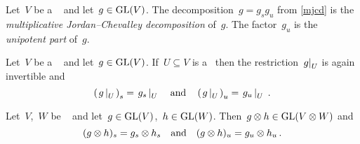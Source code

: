 \begin{definition}
  Let~$V$ be a ~ and let~$g \in \operatorname{GL}(V)$.
  The decomposition~$g = g_s g_u$ from \cref{mjcd} is the \emph{multiplicative Jordan\nobreakdash--Chevalley decomposition} of~$g$.
  The factor~$g_u$ is the \emph{unipotent part} of~$g$.
\end{definition}


\begin{lemma}
  Let~$V$ be a ~ and let~$g \in \operatorname{GL}(V)$.
  If~$U \subseteq V$ is a~ then the restriction~$\restrict{g}{U}$ is again invertible and
  \[
      \left( \restrict*{g}{U} \right)_s
    = \restrict*{g_s}{U}
    \quad\text{and}\quad
      \left( \restrict*{g}{U} \right)_u
    = \restrict*{g_u}{U} \,.
  \]
\end{lemma}




\begin{lemma}
  Let~$V$,~$W$ be ~ and let~$g \in \operatorname{GL}(V)$,~$h \in \operatorname{GL}(W)$.
  Then~$g \mathbin{\otimes} h \in \operatorname{GL}(V \mathbin{\otimes} W)$ and
  \[
      (g \mathbin{\otimes} h)_s
    = g_s \mathbin{\otimes} h_s
    \quad\text{and}\quad
      (g \mathbin{\otimes} h)_u
    = g_u \mathbin{\otimes} h_u \,.
  \]
\end{lemma}
























